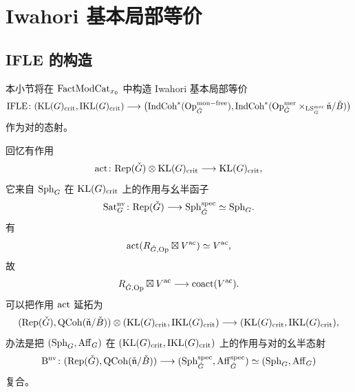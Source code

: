 
\section{Iwahori 基本局部等价}
\label{sec:ifle}

\subsection{IFLE 的构造}
\label{sec:ifle-construction}

本小节将在 $\mathrm{FactModCat}_{x_0}$ 中构造 Iwahori 基本局部等价
\[
\mathrm{IFLE}\colon (\mathrm{KL}(G)_{\mathrm{crit}},\mathrm{IKL}(G)_{\mathrm{crit}})\longrightarrow
\bigl(\mathrm{IndCoh}^{*}(\mathrm{Op}^{\mathrm{mon-free}}_{\check G}),
\mathrm{IndCoh}^{*}(\mathrm{Op}^{\mathrm{mer}}_{\check G}
\times_{\mathrm{LS}^{\mathrm{mer}}_{\check G}}\check{\mathfrak{n}}/\check B)\bigr)
\]
作为对的态射。

回忆有作用
\[
\operatorname{act}\colon \mathrm{Rep}(\check G)\otimes \mathrm{KL}(G)_{\mathrm{crit}}\longrightarrow \mathrm{KL}(G)_{\mathrm{crit}},
\]
它来自 $\mathrm{Sph}_G$ 在 $\mathrm{KL}(G)_{\mathrm{crit}}$ 上的作用与幺半函子
\[
\mathrm{Sat}^{\mathrm{nv}}_G\colon \mathrm{Rep}(\check G)\longrightarrow
\mathrm{Sph}^{\mathrm{spec}}_{\check G}\simeq \mathrm{Sph}_G .
\]
有
\[
\operatorname{act}(R_{\check G,\mathrm{Op}}\boxtimes V^{\mathrm{ac}})\simeq V^{\mathrm{ac}},
\]
故
\[
R_{\check G,\mathrm{Op}}\boxtimes V^{\mathrm{ac}}\longrightarrow \operatorname{coact}(V^{\mathrm{ac}}).
\]
可以把作用 $\operatorname{act}$ 延拓为
\[
(\mathrm{Rep}(\check G),\mathrm{QCoh}(\check{\mathfrak{n}}/\check B))\otimes
(\mathrm{KL}(G)_{\mathrm{crit}},\mathrm{IKL}(G)_{\mathrm{crit}})\longrightarrow
(\mathrm{KL}(G)_{\mathrm{crit}},\mathrm{IKL}(G)_{\mathrm{crit}}),
\]
办法是把 $(\mathrm{Sph}_G,\mathrm{Aff}_G)$ 在 $(\mathrm{KL}(G)_{\mathrm{crit}},\mathrm{IKL}(G)_{\mathrm{crit}})$ 上的作用与对的幺半态射
\[
\mathrm{B}^{\mathrm{nv}}\colon
(\mathrm{Rep}(\check G),\mathrm{QCoh}(\check{\mathfrak{n}}/\check B))\longrightarrow
(\mathrm{Sph}^{\mathrm{spec}}_{\check G},\mathrm{Aff}^{\mathrm{spec}}_{\check G})\simeq (\mathrm{Sph}_G,\mathrm{Aff}_G)
\]
复合。

